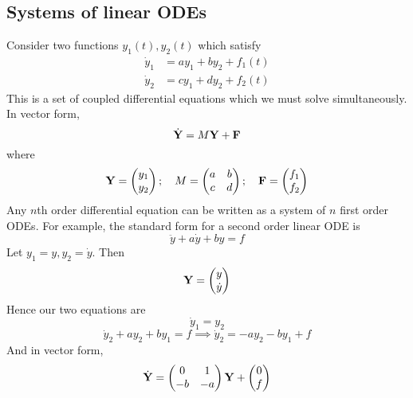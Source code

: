 \subsection{Systems of linear ODEs}
Consider two functions \(y_1(t), y_2(t)\) which satisfy
\begin{align*}
	\dot y_1 & = ay_1 + by_2 + f_1(t) \\
	\dot y_2 & = cy_1 + dy_2 + f_2(t)
\end{align*}
This is a set of coupled differential equations which we must solve simultaneously.
In vector form,
\[
	\dot{\vb Y} = M\vb Y + \vb F
\]
where
\[
	\vb Y = \begin{pmatrix}
		y_1 \\ y_2
	\end{pmatrix};\quad M = \begin{pmatrix}
		a & b \\ c & d
	\end{pmatrix};\quad \vb F = \begin{pmatrix}
		f_1 \\ f_2
	\end{pmatrix}
\]
Any \(n\)th order differential equation can be written as a system of \(n\) first order ODEs.
For example, the standard form for a second order linear ODE is
\[
	\ddot y + a\dot y + by = f
\]
Let \(y_1 = y, y_2 = \dot y\).
Then
\[
	\vb Y = \begin{pmatrix}
		y \\ \dot y
	\end{pmatrix}
\]
Hence our two equations are
\[
	\dot y_1 = y_2
\]
\[
	\dot y_2 + ay_2 + by_1 = f \implies \dot y_2 = -ay_2 - by_1 + f
\]
And in vector form,
\[
	\dot{\vb Y} = \begin{pmatrix}
		0  & 1  \\
		-b & -a
	\end{pmatrix} \vb Y + \begin{pmatrix}
		0 \\ f
	\end{pmatrix}
\]

